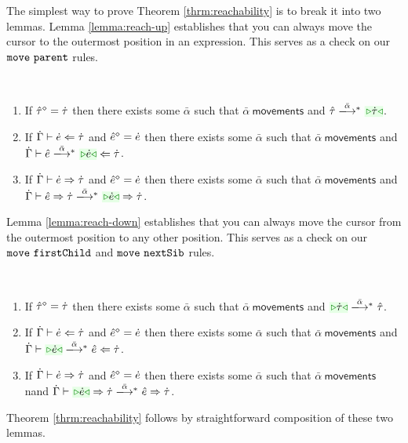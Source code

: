 The simplest way to prove Theorem \ref{thrm:reachability} is to  break it into two lemmas. Lemma \ref{lemma:reach-up} establishes that you can always move the cursor to the outermost position in an expression. This serves as a check on our $\mathtt{move}~\mathtt{parent}$ rules.
\begin{lemma}[Reach Up]\label{lemma:reach-up} ~
\begin{enumerate}[itemsep=0px,partopsep=0px,topsep=0px]
\item If $\hat{\tau}^{\diamond}=\dot{\tau}$ then there exists some $\bar\alpha$ such that $\bar\alpha~\mathsf{movements}$ and $\performTypI{\ztau}{\bar\alpha}{\zwsel{\htau}}$.
\item If $\dot{\Gamma} \vdash \dot{e} \Leftarrow \dot{\tau}$ and $\hat{e}^{\diamond}=\dot{e}$ then there exists some $\bar\alpha$ such that $\bar\alpha~\mathsf{movements}$ and $\performAnaI{\hGamma}{\zexp}{\htau}{\bar\alpha}{\zwsel{\hexp}}$. 
\item If $\dot{\Gamma} \vdash \dot{e} \Rightarrow \dot{\tau}$ and $\hat{e}^{\diamond}=\dot{e}$ then there exists some $\bar\alpha$ such that $\bar\alpha~\mathsf{movements}$ and $\performSynI{\hGamma}{\zexp}{\htau}{\bar\alpha}{\zwsel{\hexp}}{\htau}$.
\end{enumerate}
\end{lemma}
Lemma \ref{lemma:reach-down} establishes that you can always move the cursor from the outermost position to any other position. This serves as a check on our $\mathtt{move}~\mathtt{firstChild}$ and $\mathtt{move}~\mathtt{nextSib}$ rules. 
\begin{lemma}\label{lemma:reach-down} ~
\begin{enumerate}[itemsep=0px,partopsep=0px,topsep=0px]
\item If $\hat{\tau}^{\diamond}=\dot{\tau}$ then there exists some $\bar\alpha$ such that $\bar\alpha~\mathsf{movements}$ and $\performTypI{\zwsel{\htau}}{\bar\alpha}{\ztau}$.
\item If $\dot{\Gamma} \vdash \dot{e} \Leftarrow \dot{\tau}$ and $\hat{e}^{\diamond}=\dot{e}$ then there exists some $\bar\alpha$ such that $\bar\alpha~\mathsf{movements}$ and $\performAnaI{\hGamma}{\zwsel{\hexp}}{\htau}{\bar\alpha}{\zexp}$.
\item If $\dot{\Gamma} \vdash \dot{e} \Rightarrow \dot{\tau}$ and $\hat{e}^{\diamond}=\dot{e}$ then there exists some $\bar\alpha$ such that $\bar\alpha~\mathsf{movements}$ nand $\performSynI{\hGamma}{\zwsel{\hexp}}{\htau}{\bar\alpha}{\zexp}{\htau}$.
\end{enumerate}
\end{lemma}
Theorem \ref{thrm:reachability} follows by straightforward composition of these two lemmas. %

